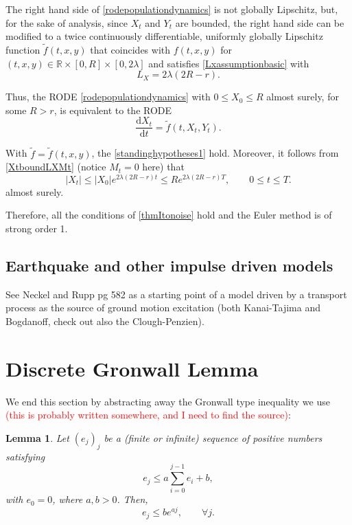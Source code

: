 \documentclass[reqno,12pt]{amsart}
\theoremstyle{plain}%
\newtheorem{lem}{Lemma}[section]
\theoremstyle{definition}
\begin{document}
The right hand side of \eqref{rodepopulationdynamics} is not globally Lipschitz, but, for the sake of analysis, since $X_t$ and $Y_t$ are bounded, the right hand side can be modified to a twice continuously differentiable, uniformly globally Lipschitz function $\tilde f(t, x, y)$ that coincides with $f(t, x, y)$ for $(t, x, y) \in \mathbb{R}\times [0, R]\times [0, 2\lambda]$ and satisfies \eqref{Lxassumptionbasic} with
\[
    L_X = 2\lambda (2R - r).
\]

Thus, the RODE \eqref{rodepopulationdynamics} with $0\leq X_0 \leq R$ almost surely, for some $R > r$, is equivalent to the RODE
\begin{equation}
    \label{rodepopulationdynamicstruncated}
    \frac{\mathrm{d}X_t}{\mathrm{d}t} = \tilde f(t, X_t, Y_t).
\end{equation}

With $\tilde f=\tilde f(t, x, y)$, the \cref{standinghypotheses1} hold. Moreover, it follows from \eqref{XtboundLXMt} (notice $M_t = 0$ here) that
\[
    |X_t| \leq |X_0|e^{2\lambda (2R - r)t} \leq R e^{2\lambda (2R - r)T}, \qquad 0 \leq t \leq T.
\]
almost surely. 

Therefore, all the conditions of \cref{thmItonoise} hold and the Euler method is of strong order 1.

\subsection{Earthquake and other impulse driven models}

See Neckel and Rupp pg 582 as a starting point of a model driven by a transport process as the source of ground motion excitation (both Kanai-Tajima and Bogdanoff, check out also the Clough-Penzien).

\appendix{}

\section{Discrete Gronwall Lemma}

We end this section by abstracting away the Gronwall type inequality we use \textcolor{red}{(this is probably written somewhere, and I need to find the source)}:
\begin{lem}
Let $(e_j)_j$ be a (finite or infinite) sequence of positive numbers satisfying
\begin{equation}
  \label{integralgronwall}
  e_j \leq a \sum_{i=0}^{j-1} e_i + b,
\end{equation}
with $e_0 = 0$, where $a, b > 0$. Then,
\begin{equation}
  \label{estimateintegralgronwall}
  e_j \leq b e^{aj}, \qquad \forall j.
\end{equation}
\end{lem}
\end{document}
